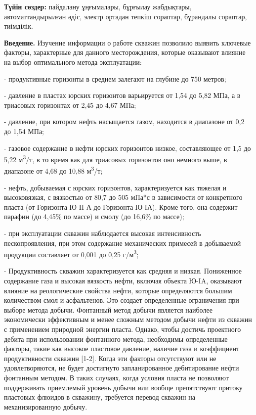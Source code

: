 {\bfseries Түйін сөздер:} пайдалану ұңғымалары, бұрғылау жабдықтары,
автоматтандырылған әдіс, электр ортадан тепкіш сораптар, бұрандалы
сораптар, тиімділік.

\begin{multicols}{2}
{\bfseries Введение.} Изучение информации о работе скважин позволило выявить ключевые факторы,
характерные для данного месторождения, которые оказывают влияние на
выбор оптимального метода эксплуатации:

- продуктивные горизонты в среднем залегают на глубине до 750 метров;

- давление в пластах юрских горизонтов варьируется от 1,54 до 5,82 МПа,
а в триасовых горизонтах от 2,45 до 4,67 МПа;

- давление, при котором нефть насыщается газом, находится в диапазоне от
0,2 до 1,54 МПа;

- газовое содержание в нефти юрских горизонтов низкое, составляющее от
1,5 до 5,22 м\textsuperscript{3}/т, в то время как для триасовых
горизонтов оно немного выше, в диапазоне от 4,68 до 10,88
м\textsuperscript{3}/т;

- нефть, добываемая с юрских горизонтов, характеризуется как тяжелая и
высоковязкая, с вязкостью от 80,7 до 505 мПа*с в зависимости от
конкретного пласта (от Горизонта Ю-II А до Горизонта Ю-IА). Кроме
того, она содержит парафин (до 4,45\% по массе) и смолу (до 16,6\% по
массе);

- при эксплуатации скважин наблюдается высокая интенсивность
пескопроявления, при этом содержание механических примесей в
добываемой продукции составляет от 0,001 до 0,25
г/м\textsuperscript{3};

- Продуктивность скважин характеризуется как средняя и низкая.
Пониженное содержание газа и высокая вязкость нефти, включая объекта
Ю-IA, оказывают влияние на реологические свойства нефти, которые
определяются большим количеством смол и асфальтенов. Это создает
определенные ограничения при выборе метода добычи. Фонтанный метод
добычи является наиболее экономически эффективным и менее сложным
методом добычи нефти из скважин с применением природной энергии пласта.
Однако, чтобы достичь проектного дебита при использовании фонтанного
метода, необходимы определенные факторы, такие как высокое пластовое
давление, наличие газа и коэффициент продуктивности скважин {[}1-2{]}.
Когда эти факторы отсутствуют или не удовлетворяются, не будет
достигнуто запланированное дебитирование нефти фонтанным методом. В
таких случаях, когда условия пласта не позволяют поддерживать приемлемый
уровень добычи или вообще препятствуют притоку пластовых флюидов в
скважину, требуется перевод скважин на механизированную добычу.


\end{multicols}
